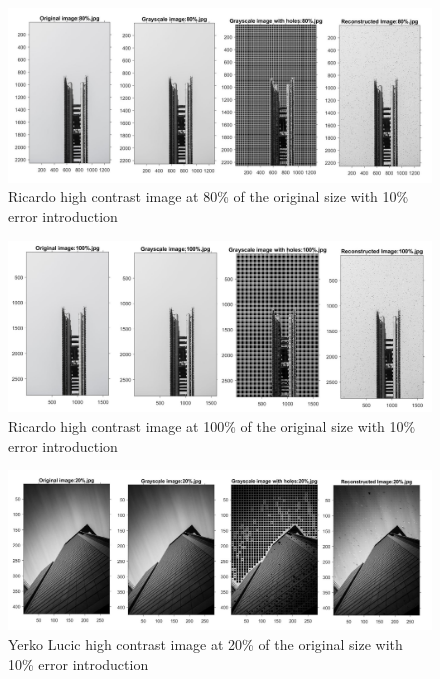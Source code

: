 \begin{figure}[!ht]
\center \includegraphics[scale=0.32]{Ricardo80.jpg}
\caption{Ricardo high contrast image at 80\% of the original size with 10\% error introduction}
\label{fig:Ricardo80}
\end{figure}

\begin{figure}[!ht]
\center \includegraphics[scale=0.32]{Ricardo100.jpg}
\caption{Ricardo high contrast image at 100\% of the original size with 10\% error introduction}
\label{fig:Ricardo100}
\end{figure}


\begin{figure}[!ht]
\center \includegraphics[scale=0.31]{YerkoLucic20.jpg}
\caption{Yerko Lucic high contrast image at 20\% of the original size with 10\% error introduction}
\label{fig:YerkoLucic20}
\end{figure}

